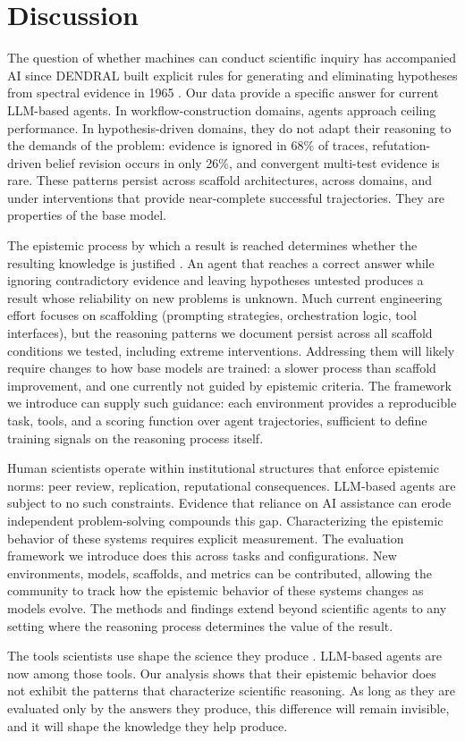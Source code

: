 \section{Discussion}

The question of whether machines can conduct scientific inquiry has accompanied AI since DENDRAL built explicit rules for generating and eliminating hypotheses from spectral evidence in 1965 \autocite{lindsay1993dendral}. Our data provide a specific answer for current LLM-based agents. 
In workflow-construction domains, agents approach ceiling performance. In hypothesis-driven domains, they do not adapt their reasoning to the demands of the problem: evidence is ignored in 68\% of traces, refutation-driven belief revision occurs in only 26\%, and convergent multi-test evidence is rare. These patterns persist across scaffold architectures, across domains, and under interventions that provide near-complete successful trajectories. They are properties of the base model.

The epistemic process by which a result is reached determines whether the resulting knowledge is justified \autocite{pittphilsci28744,krenn2022understanding, sep-knowledge-analysis}. 
An agent that reaches a correct answer while ignoring contradictory evidence and leaving hypotheses untested produces a result whose reliability on new problems is unknown. Much current engineering effort focuses on scaffolding (prompting strategies, orchestration logic, tool interfaces), but the reasoning patterns we document persist across all scaffold conditions we tested, including extreme interventions. Addressing them will likely require changes to how base models are trained: a slower process than scaffold improvement, and one currently not guided by epistemic criteria. The framework we introduce can supply such guidance: each environment provides a reproducible task, tools, and a scoring function over agent trajectories, sufficient to define training signals on the reasoning process itself.

Human scientists operate within institutional structures that enforce epistemic norms: peer review, replication, reputational consequences. LLM-based agents are subject to no such constraints. Evidence that reliance on AI assistance can erode independent problem-solving \autocite{liu2026persistence} compounds this gap. Characterizing the epistemic behavior of these systems requires explicit measurement. The evaluation framework we introduce does this across tasks and configurations. New environments, models, scaffolds, and metrics can be contributed, allowing the community to track how the epistemic behavior of these systems changes as models evolve. The methods and findings extend beyond scientific agents to any setting where the reasoning process determines the value of the result.

The tools scientists use shape the science they produce \autocite{culkin1967schoolman,hao2026artificial}. LLM-based agents are now among those tools. Our analysis shows that their epistemic behavior does not exhibit the patterns that characterize scientific reasoning. As long as they are evaluated only by the answers they produce, this difference will remain invisible, and it will shape the knowledge they help produce.